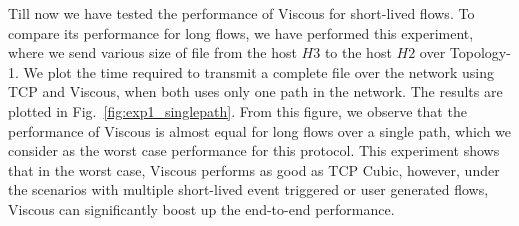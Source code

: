 Till now we have tested the performance of Viscous for short-lived flows. To compare its performance for long flows, we have performed this experiment, where we send various size of file from the host $H3$ to the host $H2$ over Topology-1. We plot the time required to transmit a complete file over the network using TCP and Viscous, when both uses only one path in the network. The results are plotted in Fig.~\ref{fig:exp1_singlepath}. From this figure, we observe that the performance of Viscous is almost equal for long flows over a single path, which we consider as the worst case performance for this protocol. This experiment shows that in the worst case, Viscous performs as good as TCP Cubic, however, under the scenarios with multiple short-lived event triggered or user generated flows, Viscous can significantly boost up the end-to-end performance. 


